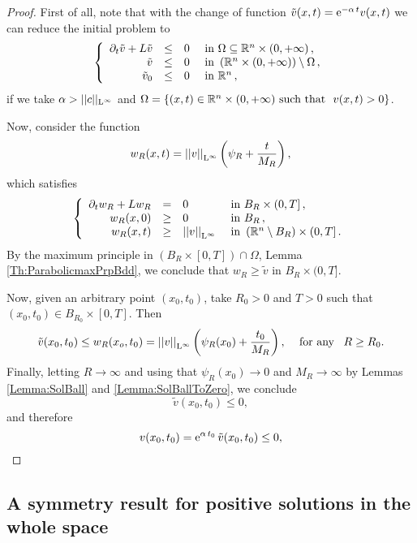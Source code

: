 \begin{proof}
First of all, note that with the change of function $\tilde{v}(x,t) = \mathrm{e}^{-\alpha\,t} v(x,t)$ we can reduce the initial problem to
\begin{equation*}
\left\{\begin{array}{rcll}
\partial_t \tilde{v} + L \tilde{v} &\leq& 0 & \textrm{ in } \Omega \subseteq\mathbb{R}^n\times(0,+\infty)\,,\\
\tilde{v} &\leq& 0 & \textrm{ in }  \left(\mathbb{R}^n\times(0,+\infty)\right) \setminus  \Omega\,,\\
\tilde{v}_0 &\leq& 0 & \textrm{ in } \mathbb{R}^n\,,
\end{array} \right.
\end{equation*}
if we take $\alpha > ||c||_{\mathrm{L}^{\infty}}$ and $\Omega = \{(x,t)\in \mathbb{R}^n\times(0,+\infty) \ \textrm{such that } \ v(x,t) > 0\}$.

Now, consider the function
$$ w_R(x,t) = \left | \left |{v} \right | \right |_{\mathrm{L}^{\infty}} \left(  \psi_R + \frac{t}{M_R} \right), $$
which satisfies
\begin{equation*}
\left\{\begin{array}{rcll}
\partial_t w_R + L w_R &=& 0 & \textrm{ in }B_R\times(0,T]\,,\\
w_R(x,0) &\geq& 0 & \textrm{ in } B_R\,,\\
w_R(x,t) &\geq& \left | \left |{v} \right | \right |_{\mathrm{L}^{\infty}}  & \textrm{ in } \left( \mathbb{R}^n\setminus B_R\right) \times (0,T] \,.
\end{array} \right.
\end{equation*}
By the maximum principle in $(B_R\times[0,T])\cap \Omega$, Lemma \ref{Th:ParabolicmaxPrpBdd}, we conclude that $ w_R\geq \tilde{v} $ in $B_R\times(0,T]$.

Now, given an arbitrary point $(x_0,t_0)$, take $R_0>0$ and $T>0$ such that $(x_0,t_0)\in B_{R_0}\times [0,T]$. Then
$$ \tilde{v}(x_0,t_0) \leq w_R(x_o,t_0) = \left | \left |{v} \right | \right |_{\mathrm{L}^{\infty}} \left(  \psi_R(x_0) + \frac{t_0}{M_R} \right), \,\,\,\,\,\text{ for any }\,\,\, R\geq R_0. $$
Finally, letting $R \to \infty$ and using that $\psi_R(x_0) \to 0$ and $M_R \to \infty$ by Lemmas \ref{Lemma:SolBall} and \ref{Lemma:SolBallToZero}, we conclude
$$ \tilde{v}(x_0,t_0) \leq 0, $$
and therefore
$$ v(x_0,t_0) = \mathrm{e}^{\alpha\,t_0}\,\tilde{v}(x_0,t_0) \leq 0, $$
\end{proof}


\subsection{A symmetry result for positive solutions in the whole space}



